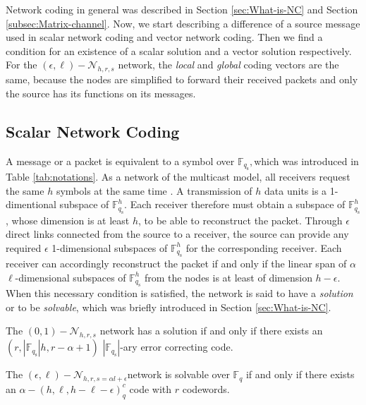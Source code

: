 Network coding in general was described in Section \ref{sec:What-is-NC}
and Section \ref{subsec:Matrix-channel}. Now, we start describing
a difference of a source message used in scalar network coding and
vector network coding. Then we find a condition for an existence of
a scalar solution and a vector solution respectively. For the $(\epsilon,\ell)-\mathcal{N}_{h,r,s}$
network, the \textit{local} and \textit{global} coding vectors are
the same, because the nodes are simplified to forward their received
packets and only the source has its functions on its messages.

\subsection{Scalar Network Coding \label{subsec:Scalar-network-coding}}

A message or a packet is equivalent to a symbol over $\ensuremath{\mathbb{F}}_{q_{\mathrm{s}}},$which
was introduced in Table \ref{tab:notations}. As a network of the
multicast model, all receivers request the same $h$ symbols at the
same time \cite{Trautmann:2013}. A transmission of $h$ data units
is a 1-dimentional subspace of $\ensuremath{\mathbb{F}}_{q_{\mathrm{s}}}^{h}$.
Each receiver therefore must obtain a subspace of $\ensuremath{\mathbb{F}}_{q_{\mathrm{s}}}^{h}$,
whose dimension is at least $h$, to be able to reconstruct the packet.
Through $\epsilon$ direct links connected from the source to a receiver,
the source can provide any required $\epsilon$ 1-dimensional subspaces
of $\ensuremath{\mathbb{F}}_{q_{\mathrm{s}}}^{h}$ for the corresponding
receiver. Each receiver can accordingly reconstruct the packet if
and only if the linear span of $\alpha$ $\ell$-dimensional subspaces
of $\ensuremath{\mathbb{F}}_{q_{\mathrm{s}}}^{h}$ from the nodes
is at least of dimension $h-\epsilon$. When this necessary condition
is satisfied, the network is said to have a \textit{solution} or to
be \textit{solvable}, which was briefly introduced in Section \ref{sec:What-is-NC}.
\begin{thm}
 The $(0,1)-\mathcal{N}_{h,r,s}$ network has a solution if and only
if there exists an $\left(r,\left|\ensuremath{\mathbb{F}}_{q_{\mathrm{s}}}\right|h,r-\alpha+1\right)$
$\left|\ensuremath{\mathbb{F}}_{q_{\mathrm{s}}}\right|$-ary error
correcting code. 
\end{thm}
%
\begin{thm}
 The $(\epsilon,\ell)-\mathcal{N}_{h,r,s=\alpha l+\epsilon}$network
is solvable over $\ensuremath{\mathbb{F}}_{q}$ if and only if there
exists an $\alpha-\left(h,\ell,h-\ell-\epsilon\right)_{q}^{c}$ code
with $r$ codewords. \label{theo:scalar_sol_exist}
\end{thm}

